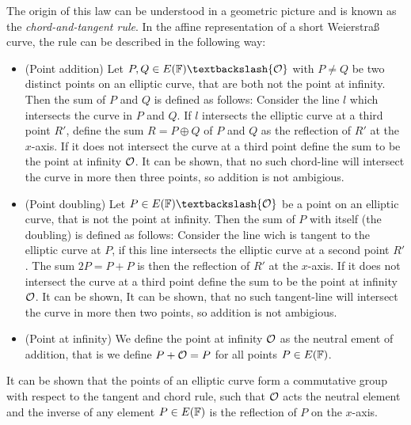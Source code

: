 The origin of this law can be understood in a geometric picture and is known as the \textit{chord-and-tangent rule}. In the affine representation of a short Weierstraß curve, the rule can be described in the following way:
\begin{itemize}
\item (Point addition) Let $P, Q\in E(\F)\textbackslash \{\Oinf\}$ with $P\neq Q$ be two distinct points on an elliptic curve, that are both not the point at infinity. Then the sum of $P$ and $Q$ is defined as follows: Consider the line $l$ which intersects the curve in $P$ and $Q$. If $l$ intersects the elliptic curve at a third point $R'$, define the sum $R=P\oplus Q$ of $P$ and $Q$ as the reflection of $R'$ at the $x$-axis. If it does not intersect the curve at a third point define the sum to be the point at infinity $\mathcal{O}$. It can be shown, that no such chord-line will intersect the curve in more then three points, so addition is not ambigious.
\item (Point doubling) Let $P \in E(\F)\textbackslash \{\Oinf\}$ be a point on an elliptic curve, that is not the point at infinity. Then the sum of $P$ with itself (the doubling) is defined as follows: Consider the line wich is tangent to the elliptic curve at $P$, if this line intersects the elliptic curve at a second point $R'$. The sum $2P=P+P$ is then the reflection of $R'$ at the $x$-axis. If it does not intersect the curve at a third point define the sum to be the point at infinity $\mathcal{O}$. It can be shown, It can be shown, that no such tangent-line will intersect the curve in more then two points, so addition is not ambigious.
\item (Point at infinity) We define the point at infinity $\mathcal{O}$ as the neutral ement of addition, that is we define $P+\mathcal{O} = P$ for all points $P\in E(\mathbb{F})$.
\end{itemize}
It can be shown that the points of an elliptic curve form a commutative group with respect to the tangent and chord rule, such that $\mathcal{O}$ acts the neutral element and the inverse of any element $P\in E(\mathbb{F})$ is the reflection of $P$ on the $x$-axis.

